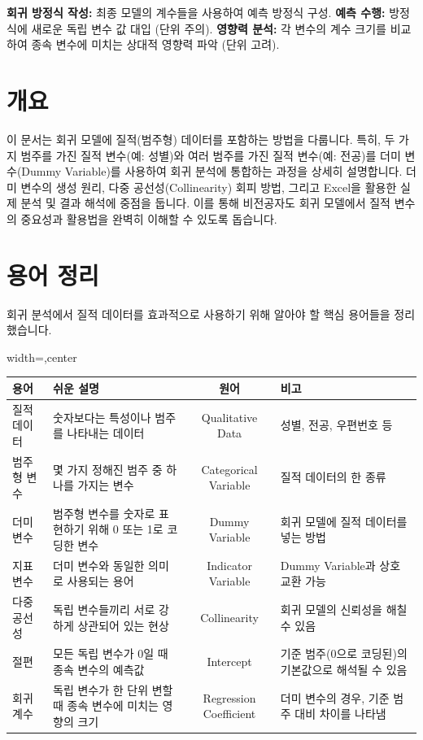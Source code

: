 \documentclass[11pt,a4paper]{article}
\begin{document}
\begin{tcolorbox}[title=\textbf{모델 활용}]
\textbf{회귀 방정식 작성:} 최종 모델의 계수들을 사용하여 예측 방정식 구성.
\textbf{예측 수행:} 방정식에 새로운 독립 변수 값 대입 (단위 주의).
\textbf{영향력 분석:} 각 변수의 계수 크기를 비교하여 종속 변수에 미치는 상대적 영향력 파악 (단위 고려).
\end{tcolorbox}

\newpage

\section*{개요}
이 문서는 회귀 모델에 질적(범주형) 데이터를 포함하는 방법을 다룹니다.
특히, 두 가지 범주를 가진 질적 변수(예: 성별)와 여러 범주를 가진 질적 변수(예: 전공)를
더미 변수(Dummy Variable)를 사용하여 회귀 분석에 통합하는 과정을 상세히 설명합니다.
더미 변수의 생성 원리, 다중 공선성(Collinearity) 회피 방법,
그리고 Excel을 활용한 실제 분석 및 결과 해석에 중점을 둡니다.
이를 통해 비전공자도 회귀 모델에서 질적 변수의 중요성과 활용법을 완벽히 이해할 수 있도록 돕습니다.

\newpage
\section*{용어 정리}
회귀 분석에서 질적 데이터를 효과적으로 사용하기 위해 알아야 할 핵심 용어들을 정리했습니다.

\begin{adjustbox}{width=\textwidth,center}
\begin{tabular}{llcl}
\toprule
\textbf{용어} & \textbf{쉬운 설명} & \textbf{원어} & \textbf{비고} \\
\midrule
질적 데이터 & 숫자보다는 특성이나 범주를 나타내는 데이터 & Qualitative Data & 성별, 전공, 우편번호 등 \\
범주형 변수 & 몇 가지 정해진 범주 중 하나를 가지는 변수 & Categorical Variable & 질적 데이터의 한 종류 \\
더미 변수 & 범주형 변수를 숫자로 표현하기 위해 0 또는 1로 코딩한 변수 & Dummy Variable & 회귀 모델에 질적 데이터를 넣는 방법 \\
지표 변수 & 더미 변수와 동일한 의미로 사용되는 용어 & Indicator Variable & Dummy Variable과 상호 교환 가능 \\
다중 공선성 & 독립 변수들끼리 서로 강하게 상관되어 있는 현상 & Collinearity & 회귀 모델의 신뢰성을 해칠 수 있음 \\
절편 & 모든 독립 변수가 0일 때 종속 변수의 예측값 & Intercept & 기준 범주(0으로 코딩된)의 기본값으로 해석될 수 있음 \\
회귀 계수 & 독립 변수가 한 단위 변할 때 종속 변수에 미치는 영향의 크기 & Regression Coefficient & 더미 변수의 경우, 기준 범주 대비 차이를 나타냄 \\
\bottomrule
\end{tabular}
\end{adjustbox}
\end{document}
